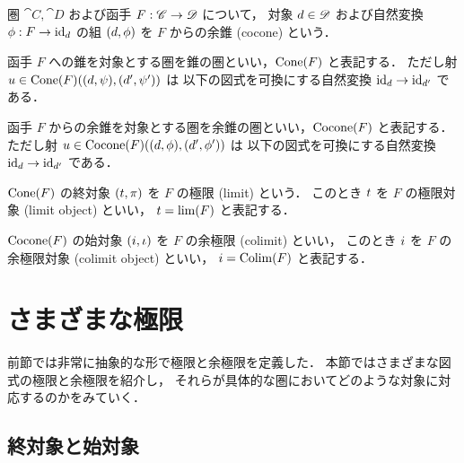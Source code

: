 \documentclass[titlepage]{ltjsreport}
\begin{document}
\begin{definition}[余錐]
  圏 $\cat{C},\cat{D}$ および函手 ${F}:{\mathscr{C}}\to{\mathscr{D}}$ について，
  対象 $\obj{d}\in\objs{\cat{D}}$ および自然変換 $\mrp{\phi}{F}{\id{\obj{d}}}$
  の組 $(\obj{d},\phi)$ を $F$ からの余錐 (cocone) という．
\end{definition}

\begin{definition}[錐の圏]
  函手 $F$ への錐を対象とする圏を錐の圏といい，$\operatorname{Cone}(F)$ と表記する．
  ただし射 $u\in\mrps{\cone(F)}{(\obj{d},\psi)}{(\obj{d'},\psi')}$ は
  以下の図式を可換にする自然変換 $\id{\obj{d}}\to\id{\obj{d'}}$ である．
  \begin{center}
    
  \end{center}
\end{definition}

\begin{definition}[余錐の圏]
  函手 $F$ からの余錐を対象とする圏を余錐の圏といい，$\operatorname{Cocone}(F)$ と表記する．
  ただし射 $u\in\operatorname{Cocone}(F)((d,\phi),(d',\phi'))$ は
  以下の図式を可換にする自然変換 $\mathrm{id}_{d}\to\mathrm{id}_{d'}$ である．
  \begin{center}
    
  \end{center}
\end{definition}

\begin{definition}[極限]
  $\operatorname{Cone}(F)$ の終対象 $(\obj{t},\pi)$ を $F$ の極限 (limit) という．
  このとき $\obj{t}$ を $F$ の極限対象 (limit object) といい，
  $\obj{t}=\lim(F)$ と表記する．
\end{definition}

\begin{definition}[余極限]
  $\operatorname{Cocone}(F)$ の始対象 $(\obj{i},\iota)$ を $F$ の余極限 (colimit) といい，
  このとき $\obj{i}$ を $F$ の余極限対象 (colimit object) といい，
  $\obj{i}=\colim(F)$ と表記する．
\end{definition}

\section{さまざまな極限}

前節では非常に抽象的な形で極限と余極限を定義した．
本節ではさまざまな図式の極限と余極限を紹介し，
それらが具体的な圏においてどのような対象に対応するのかをみていく．

\subsection{終対象と始対象}
\end{document}

